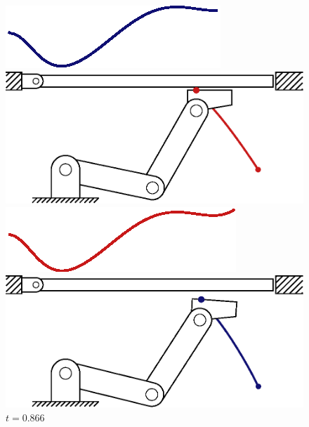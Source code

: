 \documentclass[../DC2019003Bouma.tex]{subfiles}
\begin{document}
\begin{figure}[bt!]
\begin{minipage}[c]{.3\textwidth}
\vspace{0.05cm}
	\begin{flushleft}
    \includegraphics[scale=0.55]{tracking/trcsnap_t87.eps}
	\end{flushleft}
	\caption*{$t=0.866$}
\end{minipage}
\begin{minipage}[c]{.3\textwidth}
\centering
    \includegraphics[width=\textwidth]{reference/frame30.eps}

\vspace{0.05cm}
	\begin{flushleft}
    \includegraphics[scale=0.55]{reference/refsnap_t93.eps}
	\end{flushleft}
    \includegraphics[width=\textwidth]{tracking/frame30.eps}


\end{minipage}
\end{figure}
\end{document}
